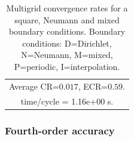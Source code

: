 \begin{table}[hbt]
\begin{center}
{\begin{tabular}{|c|c|c|c|c|}
\multicolumn{5}{|c|}{Average CR=$0.017$, ECR=$0.59$.}  \\
\multicolumn{5}{|c|}{time/cycle = 1.16e+00 s.}  \\
\hline 
\end{tabular}
} %
\end{center}
\caption{Multigrid convergence rates for a square, Neumann and mixed boundary conditions.
   Boundary conditions: D=Dirichlet, N=Neumann, M=mixed, P=periodic, I=interpolation. }
 \label{tab:sqNeumann} 
\end{table}


\clearpage
\subsubsection{Fourth-order accuracy}

